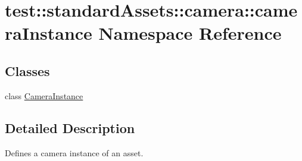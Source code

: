 \hypertarget{namespacetest_1_1standardAssets_1_1camera_1_1cameraInstance}{\section{test\-:\-:standard\-Assets\-:\-:camera\-:\-:camera\-Instance \-Namespace \-Reference}
\label{de/d30/namespacetest_1_1standardAssets_1_1camera_1_1cameraInstance}
}
\subsection*{\-Classes}
\begin{DoxyCompactItemize}
\item 
class \hyperlink{classtest_1_1standardAssets_1_1camera_1_1cameraInstance_1_1CameraInstance}{\-Camera\-Instance}
\end{DoxyCompactItemize}


\subsection{\-Detailed \-Description}
\begin{DoxyVerb}
Defines a camera instance of an asset.
\end{DoxyVerb}
 